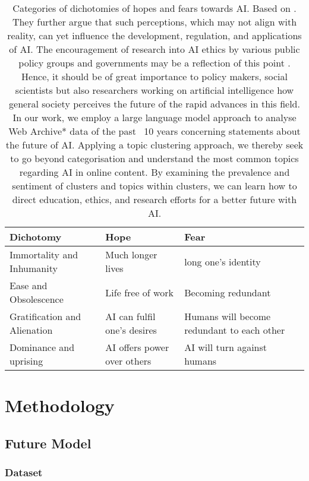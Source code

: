 \documentclass[11pt]{article}
\begin{document}
\begin{table*}
\centering
\begin{tabular}{lll}
\hline
\textbf{Dichotomy} & \textbf{Hope} & \textbf{Fear}\\
\hline
Immortality and Inhumanity & Much longer lives & long one's identity \\
Ease and Obsolescence & Life free of work & Becoming redundant \\
Gratification and Alienation  & AI can fulfil one's desires & Humans will become redundant to each other \\
Dominance and uprising & AI offers power over others & AI will turn against humans \\
\hline
\end{tabular}
\caption{\label{dichotomy-categories}
Categories of dichotomies of hopes and fears towards AI. Based on \citet{cave2019}.
They further argue that such perceptions, which may not align with reality, can yet influence the development, regulation, and applications of AI. The encouragement of research into AI ethics by various public policy groups and governments may be a reflection of this point \citep{leslie2019}. \\
Hence, it should be of great importance to policy makers, social scientists but also researchers working on artificial intelligence how general society perceives the future of the rapid advances in this field. In our work, we employ a large language model approach to analyse Web Archive* data of the past ~10 years concerning statements about the future of AI. Applying a topic clustering approach, we thereby seek to go beyond \citet{cave2019} categorisation and understand the most common topics regarding AI in online content. By examining the prevalence and sentiment of clusters and topics within clusters, we can learn how to direct education, ethics, and research efforts for a better future with AI. 
}
\end{table*}



\section{Methodology}

\subsection{Future Model}

\subsubsection{Dataset}
\end{document}
